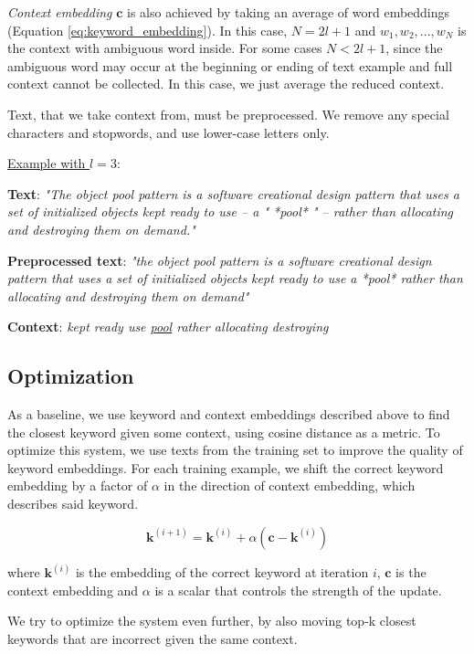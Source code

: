 \documentclass{llncs}
\begin{document}
\textit{Context embedding} \(\bm{c}\) is also achieved by taking an average of word embeddings (Equation \ref{eq:keyword_embedding}).
In this case, \(N = 2l + 1\) and \(w_1, w_2, ..., w_N\) is the context with ambiguous word inside. For some cases \(N < 2l + 1\), since the ambiguous word may occur at the beginning or ending of text example and full context cannot be collected.
In this case, we just average the reduced context.

Text, that we take context from, must be preprocessed.
We remove any special characters and stopwords, and use lower-case letters only.

\underline{Example with \(l=3\)}:

\textbf{Text}:
\textit{"The object pool pattern is a software creational design pattern that uses a set of initialized objects kept ready to use – a " *pool* " – rather than allocating and destroying them on demand."}

\textbf{Preprocessed text}:
\textit{"the object pool pattern is a software creational design pattern that uses a set of initialized objects kept ready to use a *pool* rather than allocating and destroying them on demand"}

\textbf{Context}:
\textit{kept ready use \underline{pool} rather allocating destroying}

\subsection{Optimization}
\label{sec:optimization}
As a baseline, we use keyword and context embeddings described above to find the closest keyword given some context, using cosine distance as a metric.
To optimize this system, we use texts from the training set to improve the quality of keyword embeddings.
For each training example, we shift the correct keyword embedding by a factor of \(\alpha\) in the direction of context embedding, which describes said keyword.

\begin{equation}
    \label{eq:alpha_optimization}
    \bm{k}^{(i+1)} = \bm{k}^{(i)} + \alpha(\bm{c} - \bm{k}^{(i)})
\end{equation}

where \(\bm{k}^{(i)}\) is the embedding of the correct keyword at iteration \(i\), \(\bm{c}\) is the context embedding and \(\alpha\) is a scalar that controls the strength of the update.

\smallskip
We try to optimize the system even further, by also moving top-k closest keywords that are incorrect given the same context.
\end{document}
